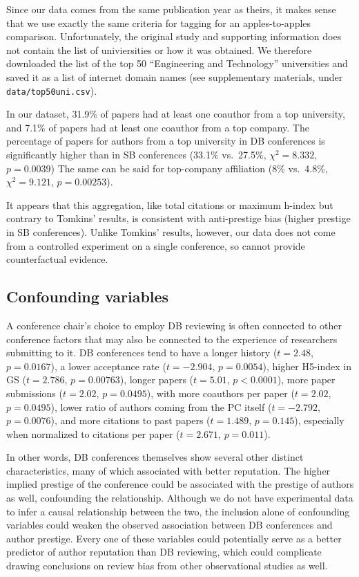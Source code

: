 \documentclass[12pt]{article}
\begin{document}
Since our data comes from the same publication year as theirs, it makes sense that we use exactly the same criteria for tagging for an apples-to-apples comparison.
Unfortunately, the original study and supporting information does not contain the list of univiersities or how it was obtained.
We therefore downloaded the list of the top 50 ``Engineering and Technology'' universities and saved it as a list of internet domain names (see supplementary materials, under \texttt{data/top50uni.csv}).

In our dataset,
31.9\%
of papers had at least one coauthor from a top university, and
7.1\%
of papers had at least one coauthor from a top company.
The percentage of papers for authors from a top university in DB conferences is significantly higher than in SB conferences
(33.1\%
vs.~27.5\%,
\(\chi{}^2=8.332\), \(p=0.0039\))
The same can be said for top-company affiliation
(8\%
vs.~4.8\%,
\(\chi{}^2=9.121\), \(p=0.00253\)).

It appears that this aggregation, like total citations or maximum h-index but contrary to Tomkins' results, is consistent with anti-prestige bias (higher prestige in SB conferences).
Unlike Tomkins' results, however, our data does not come from a controlled experiment on a single conference, so cannot provide counterfactual evidence.

\hypertarget{subsec:confounding}{%
\subsection{Confounding variables}\label{subsec:confounding}}

A conference chair's choice to employ DB reviewing is often connected to other conference factors that may also be connected to the experience of researchers submitting to it.
DB conferences tend to have a longer history
(\(t=2.48\), \(p=0.0167\)),
a lower acceptance rate
(\(t=-2.904\), \(p=0.0054\)),
higher H5-index in GS
(\(t=2.786\), \(p=0.00763\)),
longer papers
(\(t=5.01\), \(p<0.0001\)),
more paper submissions
(\(t=2.02\), \(p=0.0495\)),
with more coauthors per paper
(\(t=2.02\), \(p=0.0495\)),
lower ratio of authors coming from the PC itself
(\(t=-2.792\), \(p=0.0076\)),
and more citations to past papers
(\(t=1.489\), \(p=0.145\)),
especially when normalized to citations per paper
(\(t=2.671\), \(p=0.011\)).

In other words, DB conferences themselves show several other distinct characteristics, many of which associated with better reputation. The higher implied prestige of the conference could be associated with the prestige of authors as well, confounding the relationship.
Although we do not have experimental data to infer a causal relationship between the two, the inclusion alone of confounding variables could weaken the observed association between DB conferences and author prestige.
Every one of these variables could potentially serve as a better predictor of author reputation than DB reviewing, which could complicate drawing conclusions on review bias from other observational studies as well.
\end{document}
